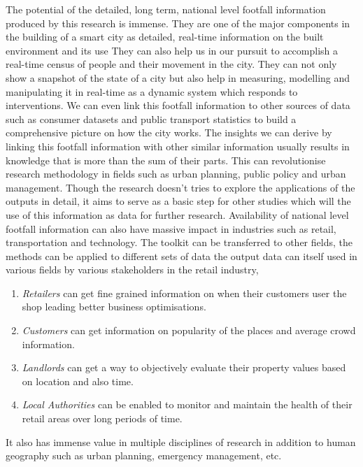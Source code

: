 
The potential of the detailed, long term, national level footfall information produced by this research is immense.
They are one of the major components in the building of a smart city as detailed, real-time information on the built environment and its use
They can also help us in our pursuit to accomplish a real-time census of people and their movement in the city.
They can not only show a snapshot of the state of a city but also help in measuring, modelling and manipulating it in real-time as a dynamic system which responds to interventions.
We can even link this footfall information to other sources of data such as consumer datasets and public transport statistics to build a comprehensive picture on how the city works.
The insights we can derive by linking this footfall information with other similar information usually results in knowledge that is more than the sum of their parts. 
This can revolutionise research methodology in fields such as urban planning, public policy and  urban management.
Though the research doesn't tries to explore the applications of the outputs in detail, it aims to serve as a basic step for other studies which will the use of this information as data for further research.
Availability of national level footfall information can also have massive impact in industries such as retail, transportation and technology.
The toolkit can be transferred to other fields, the methods can be applied to different sets of data the output data can itself used in various fields by various stakeholders in the retail industry,
\begin{enumerate}[leftmargin=2em, rightmargin=2em]
  \item \textit{Retailers} can get fine grained information on when their customers user the shop leading better business optimisations.
  \item \textit{Customers} can get information on popularity of the places and average crowd information.
  \item \textit{Landlords} can get a way to objectively evaluate their property values based on location and also time.
  \item \textit{Local Authorities} can be enabled to monitor and maintain the health of their retail areas over long periods of time. 
\end{enumerate}
It also has immense value in multiple disciplines of research in addition to human geography such as urban planning, emergency management, etc.

